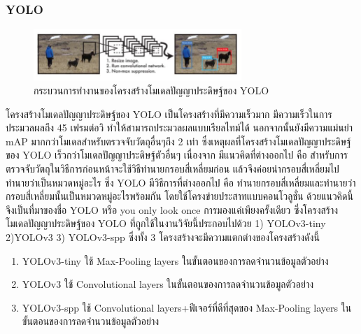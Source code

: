 \subsubsection*{YOLO}
\begin{figure}[!ht]
    \centering
    \includegraphics[width=0.7\textwidth]{chapter2/images/yolo.jpg}
    \caption{กระบวนการทำงานของโครงสร้างโมเดลปัญญาประดิษฐ์ของ YOLO}
    \label{fig:yolo}
\end{figure}

โครงสร้างโมเดลปัญญาประดิษฐ์ของ YOLO เป็นโครงสร้างที่มีความเร็วมาก มีความเร็วในการประมวลผลถึง 45 เฟรมต่อวิ ทำให้สามารถประมวลผลแบบเรียลไทม์ได้ นอกจากนั้นยังมีความแม่นยำ mAP มากกว่าโมเดลสำหรับตรวจจับวัตถุอื่นๆถึง 2 เท่า ซึ่งเหตุผลที่โครงสร้างโมเดลปัญญาประดิษฐ์ของ YOLO เร็วกว่าโมเดลปัญญาประดิษฐ์ตัวอื่นๆ เนื่องจาก มีแนวคิดที่ต่างออกไป คือ สำหรับการตรวจจับวัตถุในวิธีการก่อนหน้าจะใช้วิธีทำนายกรอบสี่เหลี่ยมก่อน แล้วจึงค่อยนำกรอบสี่เหลี่ยมไปทำนายว่าเป็นหมวดหมู่อะไร ซึ่ง YOLO มีวิธีการที่ต่างออกไป คือ ทำนายกรอบสี่เหลี่ยมและทำนายว่ากรอบสี่เหลี่ยมนั้นเป็นหมวดหมู่อะไรพร้อมกัน โดยใช้โครงข่ายประสาทแบบคอนโวลูชั่น ด้วยแนวคิดนี้จึงเป็นที่มาของชื่อ YOLO หรือ you only look once การมองแค่เพียงครั้งเดียว ซึ่งโครงสร้างโมเดลปัญญาประดิษฐ์ของ YOLO ที่ถูกใช้ในงานวิจัยนี้ประกอบไปด้วย 1) YOLOv3-tiny 2)YOLOv3 3) YOLOv3-spp	ซึ่งทั้ง 3 โครงสร้างจะมีความแตกต่างของโครงสร้างดังนี้
\begin{enumerate}
	\setlength\itemsep{-0.25em}
	\item YOLOv3-tiny ใช้ Max-Pooling layers ในขั้นตอนของการลดจำนวนข้อมูลตัวอย่าง
	\item YOLOv3 ใช้ Convolutional layers ในขั้นตอนของการลดจำนวนข้อมูลตัวอย่าง
	\item YOLOv3-spp ใช้ Convolutional layers+ฟีเจอร์ที่ดีที่สุดของ Max-Pooling layers ในขั้นตอนของการลดจำนวนข้อมูลตัวอย่าง
\end{enumerate}

